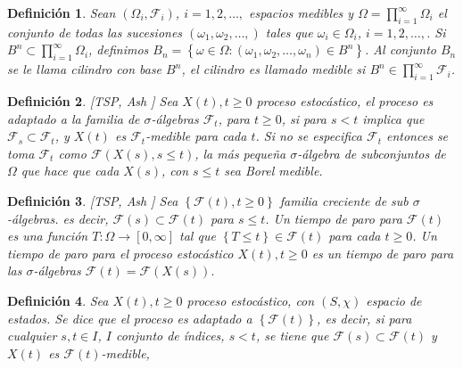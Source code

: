 \documentclass{article}
\newtheorem{Def}{Definición}
\begin{document}
\begin{Def}\label{Def.Cilindros}
Sean $\left(\Omega_{i},\mathcal{F}_{i}\right)$, $i=1,2,\ldots,$
espacios medibles y $\Omega=\prod_{i=1}^{\infty}\Omega_{i}$ el
conjunto de todas las sucesiones
$\left(\omega_{1},\omega_{2},\ldots,\right)$ tales que
$\omega_{i}\in\Omega_{i}$, $i=1,2,\ldots,$. Si
$B^{n}\subset\prod_{i=1}^{\infty}\Omega_{i}$, definimos
$B_{n}=\left\{\omega\in\Omega:\left(\omega_{1},\omega_{2},\ldots,\omega_{n}\right)\in
B^{n}\right\}$. Al conjunto $B_{n}$ se le llama {\em cilindro} con
base $B^{n}$, el cilindro es llamado medible si
$B^{n}\in\prod_{i=1}^{\infty}\mathcal{F}_{i}$.
\end{Def}


\begin{Def}\label{Def.Proc.Adaptado}[TSP, Ash \cite{RBA}]
Sea $X\left(t\right),t\geq0$ proceso estoc\'astico, el proceso es
adaptado a la familia de $\sigma$-\'algebras $\mathcal{F}_{t}$,
para $t\geq0$, si para $s<t$ implica que
$\mathcal{F}_{s}\subset\mathcal{F}_{t}$, y $X\left(t\right)$ es
$\mathcal{F}_{t}$-medible para cada $t$. Si no se especifica
$\mathcal{F}_{t}$ entonces se toma $\mathcal{F}_{t}$ como
$\mathcal{F}\left(X\left(s\right),s\leq t\right)$, la m\'as
peque\~na $\sigma$-\'algebra de subconjuntos de $\Omega$ que hace
que cada $X\left(s\right)$, con $s\leq t$ sea Borel medible.
\end{Def}


\begin{Def}\label{Def.Tiempo.Paro}[TSP, Ash \cite{RBA}]
Sea $\left\{\mathcal{F}\left(t\right),t\geq0\right\}$ familia
creciente de sub $\sigma$-\'algebras. es decir,
$\mathcal{F}\left(s\right)\subset\mathcal{F}\left(t\right)$ para
$s\leq t$. Un tiempo de paro para $\mathcal{F}\left(t\right)$ es
una funci\'on $T:\Omega\rightarrow\left[0,\infty\right]$ tal que
$\left\{T\leq t\right\}\in\mathcal{F}\left(t\right)$ para cada
$t\geq0$. Un tiempo de paro para el proceso estoc\'astico
$X\left(t\right),t\geq0$ es un tiempo de paro para las
$\sigma$-\'algebras
$\mathcal{F}\left(t\right)=\mathcal{F}\left(X\left(s\right)\right)$.
\end{Def}

\begin{Def}
Sea $X\left(t\right),t\geq0$ proceso estoc\'astico, con
$\left(S,\chi\right)$ espacio de estados. Se dice que el proceso
es adaptado a $\left\{\mathcal{F}\left(t\right)\right\}$, es
decir, si para cualquier $s,t\in I$, $I$ conjunto de \'indices,
$s<t$, se tiene que
$\mathcal{F}\left(s\right)\subset\mathcal{F}\left(t\right)$ y
$X\left(t\right)$ es $\mathcal{F}\left(t\right)$-medible,
\end{Def}
\end{document}
